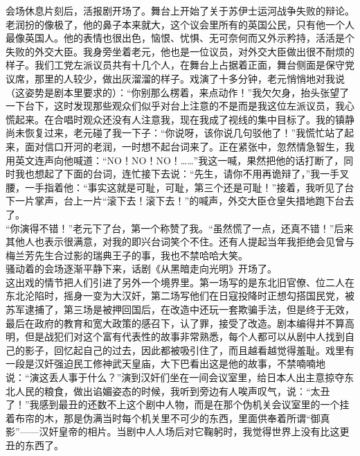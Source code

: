 会场休息片刻后，活报剧开场了。舞台上开始了关于苏伊士运河战争失败的辩论。老润扮的像极了，他的鼻子本来就大，这个议会里所有的英国公民，只有他一个人最像英国人。他的表情也很出色，恼恨、忧惧、无可奈何而又外示矜持，活活是个失败的外交大臣。我身旁坐着老元，他也是一位议员，对外交大臣做出很不耐烦的样子。我们工党左派议员共有十几个人，在舞台上占据着正面，舞台侧面是保守党议席，那里的人较少，做出灰溜溜的样子。戏演了十多分钟，老元悄悄地对我说（这姿势是剧本里要求的）：“你别那么楞着，来点动作！”我欠欠身，抬头张望了一下台下，这时发现那些观众们似乎对台上注意的不是而是我这位左派议员，我心慌起来。在合唱时观众还没有人注意我，现在我成了视线的集中目标了。我的镇静尚未恢复过来，老元碰了我一下子：“你说呀，该你说几句驳他了！”我慌忙站了起来，面对信口开河的老润，一时想不起台词来了。正在紧张中，忽然情急智生，我用英文连声向他喊道：“NO！NO！NO！……”我这一喊，果然把他的话打断了，同时我也想起了下面的台词，连忙接下去说：“先生，请你不用再诡辩了，”我一手叉腰，一手指着他：“事实这就是可耻，可耻，第三个还是可耻！”接着，我听见了台下一片掌声，台上一片“滚下去！滚下去！”的喊声，外交大臣仓皇失措地跑下台去了。\\

“你演得不错！”老元下了台，第一个称赞了我。“虽然慌了一点，还真不错！”后来其他人也表示很满意，对我的即兴台词笑个不住。还有人提起当年我拒绝会见曾与梅兰芳先生合过影的瑞典王子的事，我也不禁哈哈大笑。\\

骚动着的会场逐渐平静下来，话剧《从黑暗走向光明》开场了。\\

这出戏的情节把人们引进了另外一个境界里。第一场写的是东北旧官僚、位二人在东北沦陷时，摇身一变为大汉奸，第二场写他们在日寇投降时正想勾搭国民党，被苏军逮捕了，第三场是被押回国后，在改造中还玩一套欺骗手法，但是终于无效，最后在政府的教育和宽大政策的感召下，认了罪，接受了改造。剧本编得并不算高明，但是战犯们对这个富有代表性的故事非常熟悉，每个人都可以从剧中人找到自己的影子，回忆起自己的过去，因此都被吸引住了，而且越看越觉得羞耻。戏里有一段是汉奸强迫民工修神武天皇庙，大下巴看出这是他的故事，不禁喃喃地说：“演这丢人事于什么？”演到汉奸们坐在一间会议室里，给日本人出主意掠夺东北人民的粮食，做出谄媚姿态的时候，我听到旁边有人唉声叹气，说：“太丑了！”我感到最丑的还数不上这个剧中人物，而是在那个伪机关会议室里的一个挂着布帘的木，那是伪满当时每个机关里不可少的东西，里面供奉着所谓“御真影”——汉奸皇帝的相片。当剧中人人场后对它鞠躬时，我觉得世界上没有比这更丑的东西了。\\

